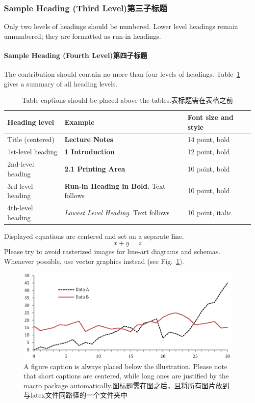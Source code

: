\documentclass[runningheads]{llncs}
\begin{document}
\subsubsection{Sample Heading (Third Level)第三子标题} Only two levels of
headings should be numbered. Lower level headings remain unnumbered;
they are formatted as run-in headings.

\paragraph{Sample Heading (Fourth Level)第四子标题}
The contribution should contain no more than four levels of
headings. Table~\ref{tab1} gives a summary of all heading levels.

\begin{table}
\caption{Table captions should be placed above the
tables.表标题需在表格之前}\label{tab1}
\begin{tabular}{|l|l|l|}
\hline
Heading level &  Example & Font size and style\\
\hline
Title (centered) &  {\Large\bfseries Lecture Notes} & 14 point, bold\\
1st-level heading &  {\large\bfseries 1 Introduction} & 12 point, bold\\
2nd-level heading & {\bfseries 2.1 Printing Area} & 10 point, bold\\
3rd-level heading & {\bfseries Run-in Heading in Bold.} Text follows & 10 point, bold\\
4th-level heading & {\itshape Lowest Level Heading.} Text follows & 10 point, italic\\
\hline
\end{tabular}
\end{table}


\noindent Displayed equations are centered and set on a separate
line.
\begin{equation}
x + y = z
\end{equation}
Please try to avoid rasterized images for line-art diagrams and
schemas. Whenever possible, use vector graphics instead (see
Fig.~\ref{fig1}).

\begin{figure}
\includegraphics[width=\textwidth]{fig1.eps}
\caption{A figure caption is always placed below the illustration.
Please note that short captions are centered, while long ones are
justified by the macro package automatically.图标题需在图之后，且将所有图片放到与latex文件同路径的一个文件夹中} \label{fig1}
\end{figure}
\end{document}
